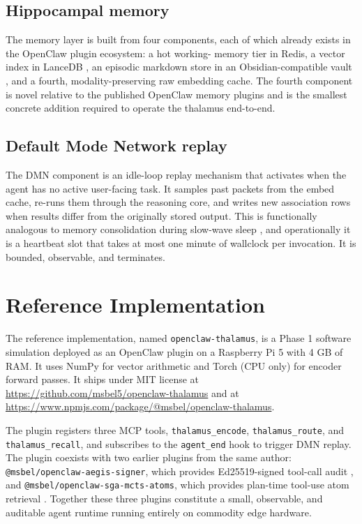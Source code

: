 \documentclass[11pt]{article}
\begin{document}
\subsection{Hippocampal memory}
The memory layer is built from four components, each of which
already exists in the OpenClaw plugin ecosystem: a hot working-
memory tier in Redis, a vector index in LanceDB \cite{memlance},
an episodic markdown store in an Obsidian-compatible vault
\cite{memwiki}, and a fourth, modality-preserving raw embedding
cache. The fourth component is novel relative to the published
OpenClaw memory plugins and is the smallest concrete addition
required to operate the thalamus end-to-end.

\subsection{Default Mode Network replay}
The DMN component is an idle-loop replay mechanism that
activates when the agent has no active user-facing task. It
samples past packets from the embed cache, re-runs them through
the reasoning core, and writes new association rows when
results differ from the originally stored output. This is
functionally analogous to memory consolidation during slow-wave
sleep \cite{dmn-review}, and operationally it is a heartbeat
slot that takes at most one minute of wallclock per invocation.
It is bounded, observable, and terminates.

\section{Reference Implementation}
\label{sec:impl}

The reference implementation, named \texttt{openclaw-thalamus},
is a Phase 1 software simulation deployed as an OpenClaw plugin
on a Raspberry Pi 5 with 4 GB of RAM. It uses NumPy for vector
arithmetic and Torch (CPU only) for encoder forward passes. It
ships under MIT license at \url{https://github.com/msbel5/openclaw-thalamus}
and at \url{https://www.npmjs.com/package/@msbel/openclaw-thalamus}.

The plugin registers three MCP tools, \texttt{thalamus\_encode},
\texttt{thalamus\_route}, and \texttt{thalamus\_recall}, and
subscribes to the \texttt{agent\_end} hook to trigger DMN replay.
The plugin coexists with two earlier plugins from the same
author: \texttt{@msbel/openclaw-aegis-signer}, which provides
Ed25519-signed tool-call audit \cite{aegis}, and
\texttt{@msbel/openclaw-sga-mcts-atoms}, which provides
plan-time tool-use atom retrieval \cite{sgamcts}. Together
these three plugins constitute a small, observable, and
auditable agent runtime running entirely on commodity edge
hardware.
\end{document}
